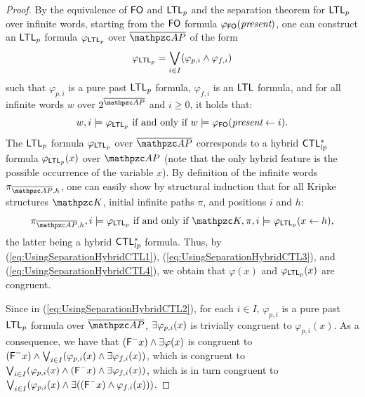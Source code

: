 \begin{proof}
 By the equivalence of $\text{\sffamily FO}$ and $\text{\sffamily LTL$_p$}$ and the separation theorem for $\text{\sffamily LTL$_p$}$ over infinite words, starting from the $\text{\sffamily FO}$ formula $\varphi_{\text{\sffamily FO}}(\textit{present})$, one can construct an $\text{\sffamily LTL$_p$}$ formula $\varphi_{\text{\sffamily LTL$_p$}}$ over $\overline{\Prop}$ of the form 
  \begin{equation}\label{eq:UsingSeparationHybridCTL2}
\varphi_{\text{\sffamily LTL$_p$}}=   \bigvee_{i\in I}(\varphi_{p,i}\wedge \varphi_{f,i})
\end{equation}
such that $\varphi_{p,i}$ %
is a pure past $\text{\sffamily LTL$_p$}$ formula,
$\varphi_{f,i}$ 
is an $\text{\sffamily LTL}$ formula, and for all infinite words $w$ over $2^{\overline{\Prop}}$ and $i\geq 0$, it holds that:
  \begin{equation}\label{eq:UsingSeparationHybridCTL3}
 w,i\models \varphi_{\text{\sffamily LTL$_p$}} \text{ if and only if } w\models \varphi_{\text{\sffamily FO}}(\textit{present} \leftarrow i).
\end{equation}
 The $\text{\sffamily LTL$_p$}$ formula $\varphi_{\text{\sffamily LTL$_p$}}$ over $\overline{\Prop}$ corresponds to a hybrid $\text{\sffamily CTL$^{*}_{lp}$}$ formula $\varphi_{\text{\sffamily LTL$_p$}}(x)$ over $\Prop$ (note that the only hybrid feature is the possible occurrence of the variable $x$).
 By definition of the infinite words $\pi_{\overline{\Prop},h}$, one can easily show by structural induction that 
  for all Kripke structures $\Ku$, initial infinite paths $\pi$, and positions $i$ and $h$:
  \begin{equation}\label{eq:UsingSeparationHybridCTL4}
\pi_{\overline{\Prop},h},i \models  \varphi_\LTLP \text{ if and only if  }  \Ku,\pi,i\models \varphi_\LTLP(x \leftarrow h),
\end{equation}
the latter being a hybrid $\text{\sffamily CTL$^{*}_{lp}$}$ formula.
Thus, by (\ref{eq:UsingSeparationHybridCTL1}), (\ref{eq:UsingSeparationHybridCTL3}), and (\ref{eq:UsingSeparationHybridCTL4}), we obtain that 
$\varphi(x)$ and $\varphi_{\text{\sffamily LTL$_p$}}(x)$ are congruent.

Since in (\ref{eq:UsingSeparationHybridCTL2}),  for each $i\in I$, $\varphi_{p,i}$ is a pure past $\text{\sffamily LTL$_p$}$ formula over $\overline{\Prop}$,  $\exists \varphi_{p,i}(x)$ is trivially congruent to $\varphi_{p,i}(x)$. As a consequence, we have that
$(\textsf{F}^{-} x)\wedge \exists \varphi(x)$ is congruent to
 $(\textsf{F}^{-} x)\wedge \bigvee_{i\in I}(\varphi_{p,i}(x)\wedge \exists\varphi_{f,i}(x))$, which is congruent to $\bigvee_{i\in I}(\varphi_{p,i}(x)\wedge (\textsf{F}^{-} x)\wedge \exists\varphi_{f,i}(x))$, which is in turn congruent to
 $\bigvee_{i\in I}(\varphi_{p,i}(x)\wedge \exists((\textsf{F}^{-} x)\wedge \varphi_{f,i}(x)))$.


\end{proof}
